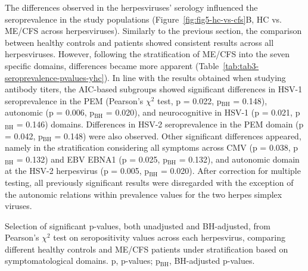 The differences observed in the herpesviruses' serology influenced the seroprevalence in the study populations (Figure~\ref{fig:fig5-hc-vs-cfs}B, HC vs. ME/CFS across herpesviruses).
Similarly to the previous section, the comparison between healthy controls and \cfs patients showed consistent results across all herpesviruses.
However, following the stratification of ME/CFS into the seven specific domains, differences became more apparent (Table~\ref{tab:tab3-seroprevalence-pvalues-yhc}).
In line with the results obtained when studying antibody titers, the AIC-based subgroups showed significant differences in HSV-1 seroprevalence in the PEM (Pearson's $\chi^2$ test, p = 0.022, p$_{\text{BH}}$ = 0.148), autonomic (p = 0.006, p$_{\text{BH}}$ = 0.020), and neurocognitive in HSV-1 (p = 0.021, p$_{\text{BH}}$ = 0.146) domains.
Differences in HSV-2 seroprevalence in the PEM domain (p = 0.042, p$_{\text{BH}}$ = 0.148) were also observed.
Other significant differences appeared, namely in the stratification considering all symptoms across CMV (p = 0.038, p$_{\text{BH}}$ = 0.132) and EBV EBNA1 (p = 0.025, p$_{\text{BH}}$ = 0.132), and autonomic domain at the HSV-2 herpesvirus (p = 0.005, p$_{\text{BH}}$ = 0.020).
After correction for multiple testing, all previously significant results were disregarded with the exception of the autonomic relations within prevalence values for the two herpes simplex viruses.

\begin{table}[h]
    \centering
    \caption[Selection of significant p-values, both unadjusted and BH-adjusted, from Pearson's $\chi^2$ test on seropositivity values across each herpesvirus, comparing different healthy controls and ME/CFS patients under stratification based on symptomatological domains]{Selection of significant p-values, both unadjusted and BH-adjusted, from Pearson's $\chi^2$ test on seropositivity values across each herpesvirus, comparing different healthy controls and ME/CFS patients under stratification based on symptomatological domains. p, p-values; p$_{\text{BH}}$, BH-adjusted p-values.}
    \resizebox{\linewidth}{!}{}
    \label{tab:tab3-seroprevalence-pvalues-yhc}
\end{table}

